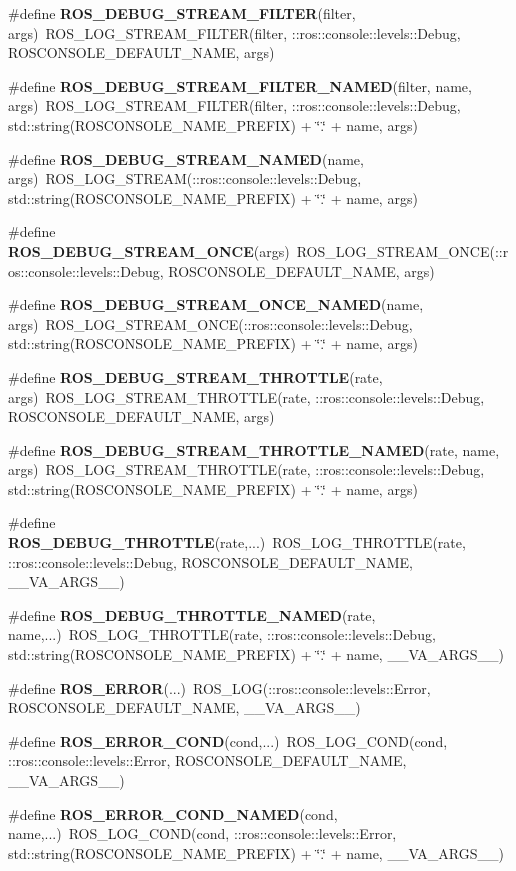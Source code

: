 \begin{DoxyCompactItemize}
\item 
\#define {\bf ROS\_\-DEBUG\_\-STREAM\_\-FILTER}(filter, args)~ROS\_\-LOG\_\-STREAM\_\-FILTER(filter, ::ros::console::levels::Debug, ROSCONSOLE\_\-DEFAULT\_\-NAME, args)
\item 
\#define {\bf ROS\_\-DEBUG\_\-STREAM\_\-FILTER\_\-NAMED}(filter, name, args)~ROS\_\-LOG\_\-STREAM\_\-FILTER(filter, ::ros::console::levels::Debug, std::string(ROSCONSOLE\_\-NAME\_\-PREFIX) + \char`\"{}.\char`\"{} + name, args)
\item 
\#define {\bf ROS\_\-DEBUG\_\-STREAM\_\-NAMED}(name, args)~ROS\_\-LOG\_\-STREAM(::ros::console::levels::Debug, std::string(ROSCONSOLE\_\-NAME\_\-PREFIX) + \char`\"{}.\char`\"{} + name, args)
\item 
\#define {\bf ROS\_\-DEBUG\_\-STREAM\_\-ONCE}(args)~ROS\_\-LOG\_\-STREAM\_\-ONCE(::ros::console::levels::Debug, ROSCONSOLE\_\-DEFAULT\_\-NAME, args)
\item 
\#define {\bf ROS\_\-DEBUG\_\-STREAM\_\-ONCE\_\-NAMED}(name, args)~ROS\_\-LOG\_\-STREAM\_\-ONCE(::ros::console::levels::Debug, std::string(ROSCONSOLE\_\-NAME\_\-PREFIX) + \char`\"{}.\char`\"{} + name, args)
\item 
\#define {\bf ROS\_\-DEBUG\_\-STREAM\_\-THROTTLE}(rate, args)~ROS\_\-LOG\_\-STREAM\_\-THROTTLE(rate, ::ros::console::levels::Debug, ROSCONSOLE\_\-DEFAULT\_\-NAME, args)
\item 
\#define {\bf ROS\_\-DEBUG\_\-STREAM\_\-THROTTLE\_\-NAMED}(rate, name, args)~ROS\_\-LOG\_\-STREAM\_\-THROTTLE(rate, ::ros::console::levels::Debug, std::string(ROSCONSOLE\_\-NAME\_\-PREFIX) + \char`\"{}.\char`\"{} + name, args)
\item 
\#define {\bf ROS\_\-DEBUG\_\-THROTTLE}(rate,...)~ROS\_\-LOG\_\-THROTTLE(rate, ::ros::console::levels::Debug, ROSCONSOLE\_\-DEFAULT\_\-NAME, \_\-\_\-VA\_\-ARGS\_\-\_\-)
\item 
\#define {\bf ROS\_\-DEBUG\_\-THROTTLE\_\-NAMED}(rate, name,...)~ROS\_\-LOG\_\-THROTTLE(rate, ::ros::console::levels::Debug, std::string(ROSCONSOLE\_\-NAME\_\-PREFIX) + \char`\"{}.\char`\"{} + name, \_\-\_\-VA\_\-ARGS\_\-\_\-)
\item 
\#define {\bf ROS\_\-ERROR}(...)~ROS\_\-LOG(::ros::console::levels::Error, ROSCONSOLE\_\-DEFAULT\_\-NAME, \_\-\_\-VA\_\-ARGS\_\-\_\-)
\item 
\#define {\bf ROS\_\-ERROR\_\-COND}(cond,...)~ROS\_\-LOG\_\-COND(cond, ::ros::console::levels::Error, ROSCONSOLE\_\-DEFAULT\_\-NAME, \_\-\_\-VA\_\-ARGS\_\-\_\-)
\item 
\#define {\bf ROS\_\-ERROR\_\-COND\_\-NAMED}(cond, name,...)~ROS\_\-LOG\_\-COND(cond, ::ros::console::levels::Error, std::string(ROSCONSOLE\_\-NAME\_\-PREFIX) + \char`\"{}.\char`\"{} + name, \_\-\_\-VA\_\-ARGS\_\-\_\-)

\end{DoxyCompactItemize}
